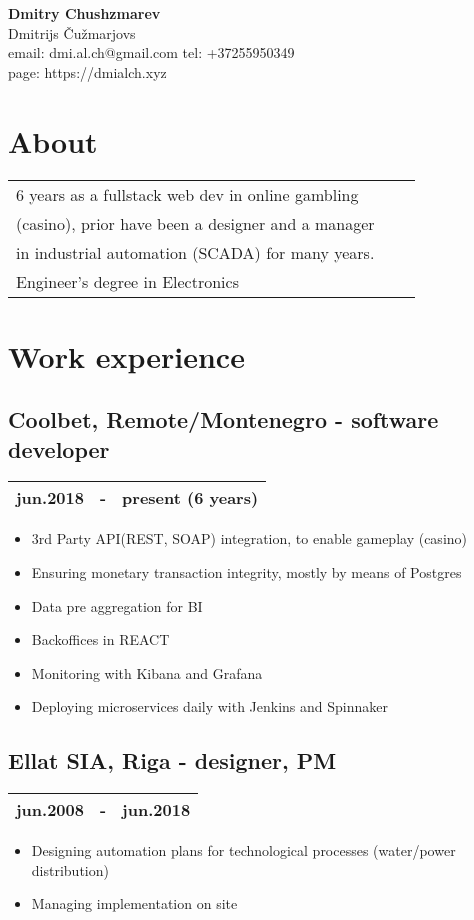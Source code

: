\documentclass[10pt]{article}
\begin{document}
\begingroup
\centering
\LARGE \textbf{Dmitry Chushzmarev}\\
\large Dmitrijs Čužmarjovs\\
\large email: dmi.al.ch@gmail.com tel: +37255950349\\
\large page: https://dmialch.xyz\\
\endgroup
\vspace{0.25em}

\begin{multicols*}{2}
\section*{About}
\begin{tabular}{lll}
6 years as a fullstack web dev in online gambling\\
(casino), prior have been a designer and a manager\\
in industrial automation (SCADA) for many years.\\
Engineer's degree in Electronics  
\end{tabular}
\section*{Work experience}
\subsection*{Coolbet, \textmd{Remote/Montenegro} - \textmd{software developer}}
\begin{tabular}{lll}
    jun.2018 & - & present (6 years)\\
    \hline
\end{tabular}
\begin{itemize}
    \item 3rd Party API(REST, SOAP) integration, to enable gameplay (casino)
    \item Ensuring monetary transaction integrity, mostly by means of Postgres  
    \item Data pre aggregation for BI
    \item Backoffices in REACT
    \item Monitoring with Kibana and Grafana
    \item Deploying microservices daily with Jenkins and Spinnaker
\end{itemize}
\subsection*{Ellat SIA, \textmd{Riga} - \textmd{designer, PM}}
\begin{tabular}{lll}
    jun.2008 & - & jun.2018\\
    \hline
\end{tabular}
\begin{itemize}
    \item Designing automation plans for technological processes (water/power distribution)
    \item Managing implementation on site
\end{itemize}

\end{multicols*}
\end{document}
